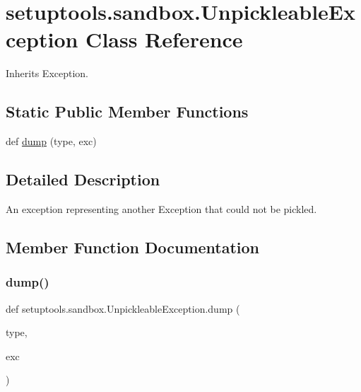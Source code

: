 \hypertarget{classsetuptools_1_1sandbox_1_1_unpickleable_exception}{}\section{setuptools.\+sandbox.\+Unpickleable\+Exception Class Reference}
\label{classsetuptools_1_1sandbox_1_1_unpickleable_exception}


Inherits Exception.

\subsection*{Static Public Member Functions}
\begin{DoxyCompactItemize}
\item 
def \hyperlink{classsetuptools_1_1sandbox_1_1_unpickleable_exception_af422ad487e1865fe760f193c6e63960c}{dump} (type, exc)
\end{DoxyCompactItemize}


\subsection{Detailed Description}
\begin{DoxyVerb}An exception representing another Exception that could not be pickled.
\end{DoxyVerb}
 

\subsection{Member Function Documentation}
\mbox{\label{classsetuptools_1_1sandbox_1_1_unpickleable_exception_af422ad487e1865fe760f193c6e63960c}} 
\subsubsection{\texorpdfstring{dump()}{dump()}}
{\footnotesize\ttfamily def setuptools.\+sandbox.\+Unpickleable\+Exception.\+dump (\begin{DoxyParamCaption}\item[{}]{type,  }\item[{}]{exc }\end{DoxyParamCaption})\hspace{0.3cm}{\ttfamily [static]}}

